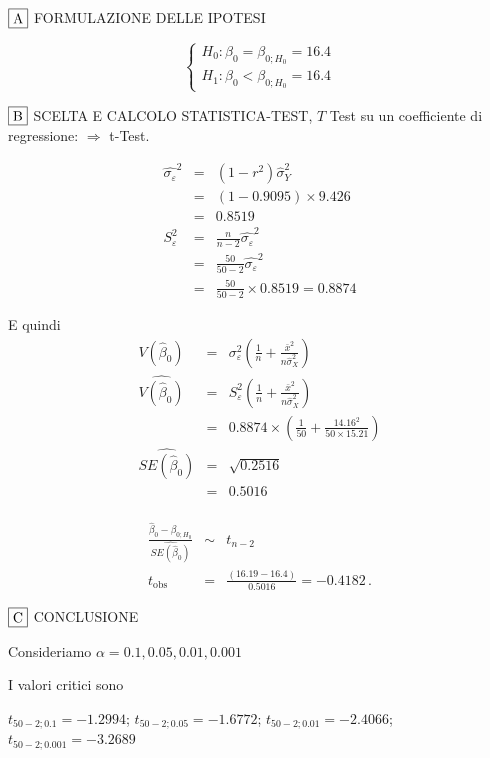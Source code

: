 \documentclass[
  11pt,
]{book}
\theoremstyle{mytheoremstyle}
\theoremstyle{mydefstyle}
\newenvironment{sol}
  {
  \begin{tcolorbox}[enhanced,breakable,arc=0.1mm,boxrule=1pt,colback=white,colframe=iblue,
  title=\bf \fontfamily{lmss}\selectfont \hspace{.5 cm} Soluzione,drop fuzzy shadow]

}{
\end{tcolorbox}
  }
\begin{document}
\begin{sol}
\(\fbox{A}\) FORMULAZIONE DELLE IPOTESI

\[\begin{cases}
   H_0: \beta_0 = \beta_{0;H_0}=16.4 \\
   H_1: \beta_0 < \beta_{0;H_0}=16.4 
   \end{cases}\]

\(\fbox{B}\) SCELTA E CALCOLO STATISTICA-TEST, \(T\)
Test su un coefficiente di regressione: \(\Rightarrow\) t-Test.

\begin{eqnarray*}
\hat{\sigma_\varepsilon}^2&=&(1-r^2)\hat\sigma_Y^2\\
&=& (1- 0.9095 )\times 9.426 \\
   &=&  0.8519 \\
   S_\varepsilon^2 &=& \frac{n} {n-2} \hat{\sigma_\varepsilon}^2\\
   &=&  \frac{ 50 } { 50 -2} \hat{\sigma_\varepsilon}^2 \\
 &=&  \frac{ 50 } { 50 -2} \times  0.8519  =  0.8874  
\end{eqnarray*}

E quindi\begin{eqnarray*}
V(\hat\beta_{0}) &=& \sigma_{\varepsilon}^{2} \left( \frac{1} {n}  +  \frac{\bar{x}^{2}} {n \hat{\sigma}^{2}_{X}} \right)\\
\widehat{V(\hat\beta_{0})} &=& S_{\varepsilon}^{2}\left( \frac{1} {n}  +  \frac{\bar{x}^{2}} {n \hat{\sigma}^{2}_{X}} \right)\ \\
 &=&  0.8874 \times\left( \frac{1} { 50 }  +  \frac{ 14.16 ^{2}} { 50 \times  15.21 } \right)\\
 \widehat{SE(\hat\beta_{0})}        &=&  \sqrt{ 0.2516 }\\
 &=&  0.5016 
\end{eqnarray*}\\
\begin{eqnarray*}
 \frac{\hat\beta_{ 0 } - \beta_{ 0 ;H_0}} {\widehat{SE(\hat\beta_{ 0 })}}&\sim&t_{n-2}\\
   t_{\text{obs}}
&=& \frac{ ( 16.19 -  16.4 )} { 0.5016 }
 =   -0.4182 \, .
\end{eqnarray*}

\(\fbox{C}\) CONCLUSIONE

Consideriamo \(\alpha=0.1, 0.05, 0.01, 0.001\)

I valori critici sono

\(t_{50-2;0.1}=-1.2994\); \(t_{50-2;0.05}=-1.6772\); \(t_{50-2;0.01}=-2.4066\); \(t_{50-2;0.001}=-3.2689\)


\end{sol}
\end{document}

